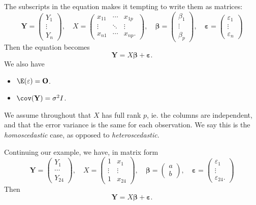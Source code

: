 \documentclass[a4paper]{article}
\begin{document}
The subscripts in the equation makes it tempting to write them as matrices:
\[
  \mathbf{Y} =
  \begin{pmatrix}
    Y_1\\
    \vdots\\
    Y_n
  \end{pmatrix}, \quad
  X =
  \begin{pmatrix}
    x_{11} & \cdots & x_{1p}\\
    \vdots & \ddots & \vdots\\
    x_{n1} & \cdots & x_{np}.
  \end{pmatrix},\quad
  \boldsymbol\beta =
  \begin{pmatrix}
    \beta_1\\
    \vdots\\
    \beta_p
  \end{pmatrix}, \quad
  \boldsymbol\varepsilon =
  \begin{pmatrix}
    \varepsilon_1\\
    \vdots\\
    \varepsilon_n
  \end{pmatrix}
\]
Then the equation becomes
\[
  \mathbf{Y} = X\boldsymbol\beta + \boldsymbol\varepsilon.\tag{2}
\]
We also have
\begin{itemize}
  \item $\E(\varepsilon) = \mathbf{O}$.
  \item $\cov (\mathbf{Y}) = \sigma^2 I$.
\end{itemize}
We assume throughout that $X$ has full rank $p$, ie. the columns are independent, and that the error variance is the same for each observation. We say this is the \emph{homoscedastic} case, as opposed to \emph{heteroscedastic}.

\begin{eg}
  Continuing our example, we have, in matrix form
  \[
    \mathbf{Y} =
    \begin{pmatrix}
      Y_1\\
      \cdots\\
      Y_{24}
    \end{pmatrix}, \quad
    X =
    \begin{pmatrix}
      1 & x_1\\
      \vdots & \vdots \\
      1 & x_{24}
    \end{pmatrix}, \quad
    \boldsymbol\beta =
    \begin{pmatrix}
      a\\
      b
    \end{pmatrix}, \quad
    \boldsymbol\varepsilon =
    \begin{pmatrix}
      \varepsilon_1\\
      \vdots\\
      \varepsilon_{24}.
    \end{pmatrix}
  \]
  Then
  \[
    \mathbf{Y} = X\boldsymbol\beta + \boldsymbol\varepsilon.
  \]
\end{eg}
\end{document}
